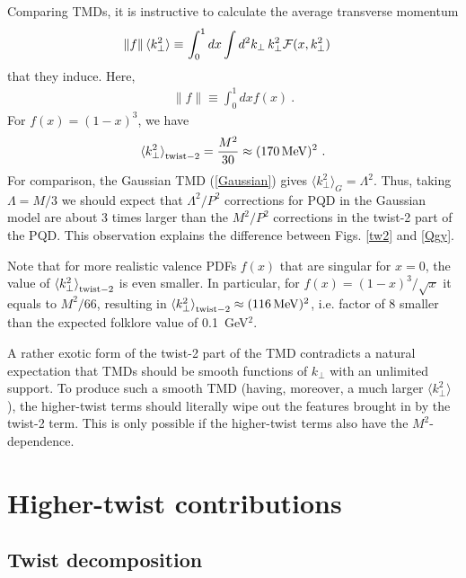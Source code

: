 \documentclass[final,5p,times,twocolumn]{elsarticle}
\begin{document}
 Comparing TMDs, 
 it  is instructive to calculate the average transverse momentum 
 \begin{align}
\| f \| \, \langle k_\perp^2  \rangle \equiv & \, \int_0^1 dx \int d^2 k_\perp\, k_\perp^2  {\cal F} (x, k_\perp^2)  
 \label{kavGen}
\end{align}
 that they induce. Here, 
\begin{align}
\| f \|  \equiv   \int_0^1 dx  f (x) \ . 
 \label{fno}
\end{align}
For $f(x)= (1-x)^3$, we have
\begin{align}
{\langle k_\perp^2  \rangle} _{\rm twist-2}  = \frac{M^2}{30} \approx  (170\, {\rm MeV})^2 \  .
 \label{kavn2}
\end{align}
For comparison, the Gaussian TMD (\ref{Gaussian}) 
gives ${\langle k_\perp^2  \rangle} _G = \Lambda^2$. 
Thus,  taking $\Lambda=M/3$   we  should  expect that $\Lambda^2/P^2$ corrections 
for PQD in the Gaussian model are  about 3 times larger 
than the $M^2/P^2$  corrections in the twist-2 part of the PQD.
This observation explains the difference between Figs. \ref{tw2} and \ref{Qgy}. 

Note that for more realistic valence PDFs $f(x)$ that are singular for
$x=0$,  the value of ${\langle k_\perp^2  \rangle} _{\rm twist-2}$ is even smaller.
In particular, for $f(x) =(1-x)^3/\sqrt{x}$   it equals to $M^2/66$, resulting 
in ${\langle k_\perp^2  \rangle} _{\rm twist-2}\approx  (116\, {\rm MeV})^2 $,
i.e. factor of 8 smaller than the expected folklore value of 0.1\, GeV$^2$. 
 
  A  rather exotic form of the twist-2 part of the TMD contradicts a  natural 
expectation 
 that TMDs  should be  smooth functions of $k_\perp$ with an unlimited support.  
 To produce  such a smooth TMD 
 (having, moreover,   a much larger ${\langle k_\perp^2  \rangle}$),
 the higher-twist terms should literally wipe out the features brought in  by  the twist-2 term.
 This is only possible if the higher-twist   terms  also 
 have the $M^2$-dependence.
    
 \setcounter{equation}{0}  
 
 \section{Higher-twist contributions} 
 
 \subsection{Twist decomposition} 
 
\end{document}
